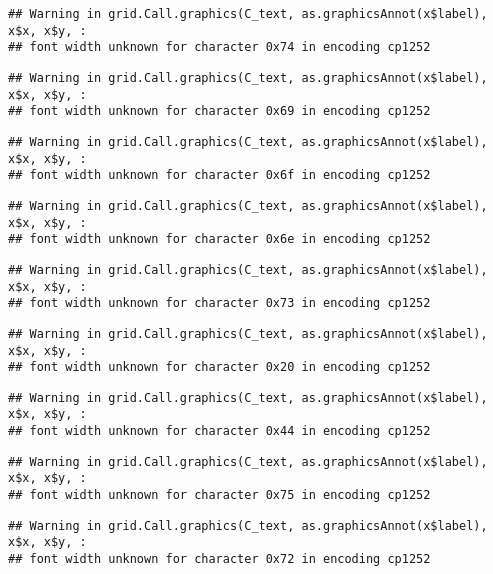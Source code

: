 \documentclass[
]{article}
\begin{document}
\begin{verbatim}
## Warning in grid.Call.graphics(C_text, as.graphicsAnnot(x$label), x$x, x$y, :
## font width unknown for character 0x74 in encoding cp1252
\end{verbatim}

\begin{verbatim}
## Warning in grid.Call.graphics(C_text, as.graphicsAnnot(x$label), x$x, x$y, :
## font width unknown for character 0x69 in encoding cp1252
\end{verbatim}

\begin{verbatim}
## Warning in grid.Call.graphics(C_text, as.graphicsAnnot(x$label), x$x, x$y, :
## font width unknown for character 0x6f in encoding cp1252
\end{verbatim}

\begin{verbatim}
## Warning in grid.Call.graphics(C_text, as.graphicsAnnot(x$label), x$x, x$y, :
## font width unknown for character 0x6e in encoding cp1252
\end{verbatim}

\begin{verbatim}
## Warning in grid.Call.graphics(C_text, as.graphicsAnnot(x$label), x$x, x$y, :
## font width unknown for character 0x73 in encoding cp1252
\end{verbatim}

\begin{verbatim}
## Warning in grid.Call.graphics(C_text, as.graphicsAnnot(x$label), x$x, x$y, :
## font width unknown for character 0x20 in encoding cp1252
\end{verbatim}

\begin{verbatim}
## Warning in grid.Call.graphics(C_text, as.graphicsAnnot(x$label), x$x, x$y, :
## font width unknown for character 0x44 in encoding cp1252
\end{verbatim}

\begin{verbatim}
## Warning in grid.Call.graphics(C_text, as.graphicsAnnot(x$label), x$x, x$y, :
## font width unknown for character 0x75 in encoding cp1252
\end{verbatim}

\begin{verbatim}
## Warning in grid.Call.graphics(C_text, as.graphicsAnnot(x$label), x$x, x$y, :
## font width unknown for character 0x72 in encoding cp1252
\end{verbatim}
\end{document}
